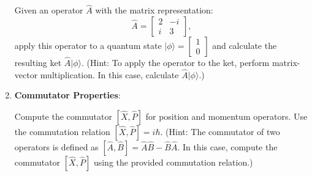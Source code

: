 \documentclass[a4paper]{article}
\begin{document}
\begin{enumerate}
    Given an operator $\hat{A}$ with the matrix representation:
    \[
    \hat{A} = \begin{bmatrix}
    2 & -i \\
    i & 3
    \end{bmatrix},
    \]
    apply this operator to a quantum state $|\phi\rangle = \begin{bmatrix} 1 \\ 0 \end{bmatrix}$ and calculate the resulting ket $\hat{A}|\phi\rangle$. (Hint: To apply the operator to the ket, perform matrix-vector multiplication. In this case, calculate $\hat{A}|\phi\rangle$.)

    \item \textbf{Commutator Properties}:
    
    Compute the commutator $[\hat{X}, \hat{P}]$ for position and momentum operators. Use the commutation relation $[\hat{X}, \hat{P}] = i\hbar$. (Hint: The commutator of two operators is defined as $[\hat{A}, \hat{B}] = \hat{A}\hat{B} - \hat{B}\hat{A}$. In this case, compute the commutator $[\hat{X}, \hat{P}]$ using the provided commutation relation.)
\end{enumerate}
\end{document}
